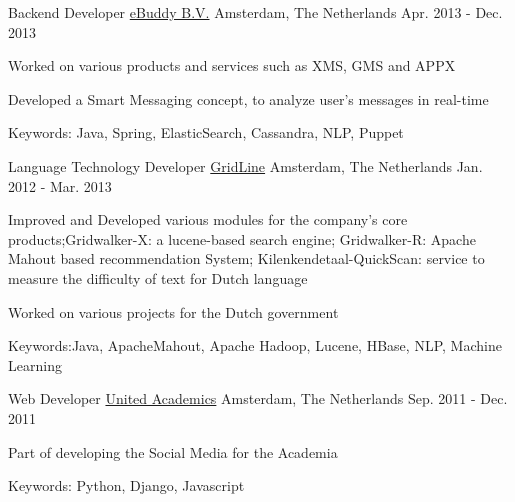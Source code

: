 \begin{cventries}
  \cventry
    {Backend Developer} %
    {\href{http://ebuddy.com/}{eBuddy B.V.}} %
    {Amsterdam, The Netherlands} %
    {Apr. 2013 - Dec. 2013} %
    {
      \begin{cvitems} %
        \item {Worked on various products and services such as XMS, GMS and APPX}
        \item {Developed a Smart Messaging concept, to analyze user's messages in real-time}
        \item {Keywords: Java, Spring, ElasticSearch, Cassandra, NLP, Puppet}
      \end{cvitems}
    }

  \cventry
    {Language Technology Developer} %
    {\href{http://gridline.nl}{GridLine}} %
    {Amsterdam, The Netherlands} %
    {Jan. 2012 - Mar. 2013} %
    {
      \begin{cvitems} %
        \item {Improved and Developed various modules for the company's core products;Gridwalker-X: a lucene-based search engine; Gridwalker-R: Apache Mahout based recommendation System; Kilenkendetaal-QuickScan: service to measure the difficulty of text for Dutch language}
        \item {Worked on various projects for the Dutch government}
        \item {Keywords:Java, ApacheMahout, Apache Hadoop, Lucene, HBase, NLP, Machine Learning}
      \end{cvitems}
    }

  \cventry
    {Web Developer} %
    {\href{http://www.ua-foundation.org/}{United Academics}} %
    {Amsterdam, The Netherlands} %
    {Sep. 2011 - Dec. 2011} %
    {
      \begin{cvitems} %
        \item {Part of developing the Social Media for the Academia}
        \item {Keywords: Python, Django, Javascript}
      \end{cvitems}
    }


\end{cventries}
